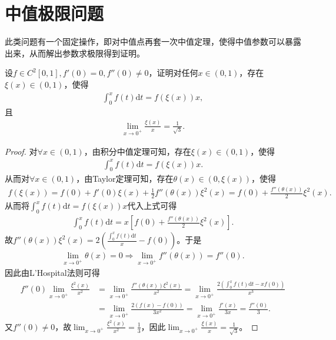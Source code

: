 \documentclass[../../main.tex]{subfiles}%
\begin{document}
\section{中值极限问题}

此类问题有一个固定操作，即对中值点再套一次中值定理，使得中值参数可以暴露出来，从而解出参数求极限得到证明。

\begin{example}
设$f\in C^2[0,1],f'(0)=0,f''(0)\neq 0$，证明对任何$x\in(0,1)$，存在$\xi(x)\in(0,1)$，使得
\begin{align*}
\int_0^x f(t)\mathrm{d}t = f(\xi(x))x,
\end{align*}
且
\begin{align*}
\lim_{x\to 0^+}\frac{\xi(x)}{x}=\frac{1}{\sqrt{3}}.
\end{align*} 
\end{example}
\begin{proof}
对$\forall x\in(0,1)$，由积分中值定理可知，存在$\xi(x)\in(0,1)$，使得
\begin{align*}
\int_0^x f(t) \mathrm{d}t = f(\xi(x))x.
\end{align*}
从而对$\forall x\in(0,1)$，由Taylor定理可知，存在$\theta(x)\in(0,\xi(x))$，使得
\begin{align*}
f(\xi(x)) = f(0) + f'(0)\xi(x) + \frac{1}{2}f''(\theta(x))\xi^2(x) = f(0) + \frac{f''(\theta(x))}{2}\xi^2(x).
\end{align*}
从而将$\int_0^x f(t)\mathrm{d}t = f(\xi(x))x$代入上式可得
\begin{align*}
\int_0^x f(t)\mathrm{d}t = x\left[f(0) + \frac{f''(\theta(x))}{2}\xi^2(x)\right].
\end{align*}
故$f''(\theta(x))\xi^2(x) = 2\left(\frac{\int_0^x f(t)\mathrm{d}t}{x} - f(0)\right)$。于是
\begin{align*}
\lim_{x\to 0^+}\theta(x) = 0 \Rightarrow \lim_{x\to 0^+}f''(\theta(x)) = f''(0).
\end{align*}
因此由L'Hospital法则可得
\begin{align*}
f''(0)\lim_{x\to 0^+}\frac{\xi^2(x)}{x^2} &= \lim_{x\to 0^+}\frac{f''(\theta(x))\xi^2(x)}{x^2} = \lim_{x\to 0^+}\frac{2\left(\int_0^x f(t)\mathrm{d}t - xf(0)\right)}{x^3}\\
&= \lim_{x\to 0^+}\frac{2\left(f(x) - f(0)\right)}{3x^2} = \lim_{x\to 0^+}\frac{f'(x)}{3x} = \frac{f''(0)}{3}.
\end{align*}
又$f''(0)\neq 0$，故$\lim_{x\to 0^+}\frac{\xi^2(x)}{x^2} = \frac{1}{3}$，因此$\lim_{x\to 0^+}\frac{\xi(x)}{x} = \frac{1}{\sqrt{3}}$。 
\end{proof}
\end{document}
